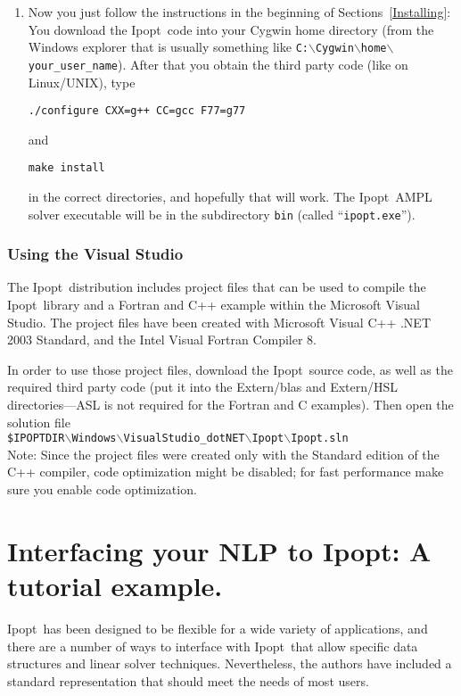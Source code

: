\documentclass[letter,10pt]{article}
\newcommand{\Ipopt}{{\sc Ipopt}}
\begin{document}
\begin{enumerate}
\item Now you just follow the instructions in the beginning of
  Sections~\ref{Installing}:  You download the \Ipopt\ code into
  your Cygwin home directory (from the Windows explorer that is
  usually something like
  \texttt{C:$\backslash$Cygwin$\backslash$home$\backslash$your\_user\_name}).
  After that you obtain the third party code (like on Linux/UNIX),
  type

  \texttt{./configure CXX=g++ CC=gcc F77=g77}

  and

  \texttt{make install}

  in the correct directories, and hopefully that will work.  The
  \Ipopt\ AMPL solver executable will be in the subdirectory
  \texttt{bin} (called ``\texttt{ipopt.exe}'').
\end{enumerate}

\subsubsection{Using the Visual Studio}\label{VisualStudioInstall}

The \Ipopt\ distribution includes project files that can be used to
compile the \Ipopt\ library and a Fortran and C++ example within the
Microsoft Visual Studio.  The project files have been created with
Microsoft Visual C++ .NET 2003 Standard, and the Intel Visual Fortran
Compiler 8.

In order to use those project files, download the \Ipopt\ source code,
as well as the required third party code (put it into the Extern/blas
and Extern/HSL directories---ASL is not required for the Fortran and C
examples). Then open the solution file\\

\texttt{\$IPOPTDIR$\backslash$Windows$\backslash$VisualStudio\_dotNET$\backslash$Ipopt$\backslash$Ipopt.sln}\\

Note: Since the project files were created only with the Standard
edition of the C++ compiler, code optimization might be disabled; for
fast performance make sure you enable code optimization.

\section{Interfacing your NLP to \Ipopt: A tutorial example.}

\Ipopt\ has been designed to be flexible for a wide variety of
applications, and there are a number of ways to interface with \Ipopt\
that allow specific data structures and linear solver
techniques. Nevertheless, the authors have included a standard
representation that should meet the needs of most users.
\end{document}

